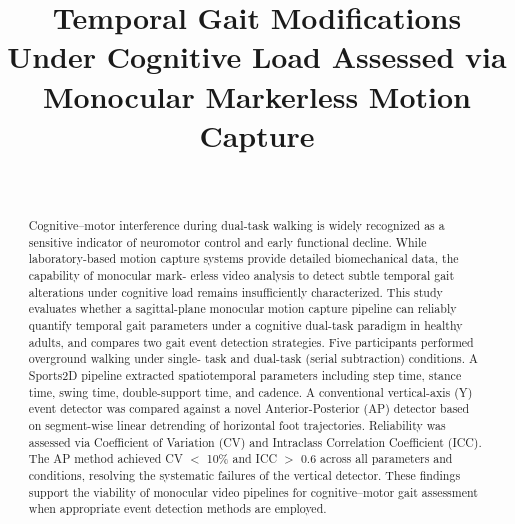 \documentclass[conference]{IEEEtran}
\begin{document}
\title{Temporal Gait Modifications Under Cognitive Load
Assessed via Monocular Markerless Motion Capture}


\author{
    \and

    \\[0.5cm]

    \and
}
\maketitle

\begin{abstract}
Cognitive–motor interference during dual-task walking is
widely recognized as a sensitive indicator of neuromotor
control and early functional decline.
While laboratory-based motion capture systems provide
detailed biomechanical data, the capability of monocular mark-
erless video analysis to detect subtle temporal gait alterations
under cognitive load remains insufficiently characterized.
This study evaluates whether a sagittal-plane monocular
motion capture pipeline can reliably quantify temporal gait
parameters under a cognitive dual-task paradigm in healthy
adults, and compares two gait event detection strategies.
Five participants performed overground walking under single-
task and dual-task (serial subtraction) conditions. A Sports2D
pipeline extracted spatiotemporal parameters including step
time, stance time, swing time, double-support time, and cadence.
A conventional vertical-axis (Y) event detector was compared
against a novel Anterior-Posterior (AP) detector based on
segment-wise linear detrending of horizontal foot trajectories.
Reliability was assessed via Coefficient of Variation (CV) and
Intraclass Correlation Coefficient (ICC). The AP method
achieved CV $<$ 10\% and ICC $>$ 0.6 across all parameters
and conditions, resolving the systematic failures of the vertical
detector. These findings support the viability of monocular
video pipelines for cognitive–motor gait assessment when
appropriate event detection methods are employed.
\end{abstract}
\vspace{3mm}
\end{document}
